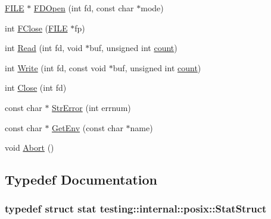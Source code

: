 \begin{DoxyCompactItemize}
\item 
\hyperlink{gmock__output__test__golden_8txt_ab12dc6c67167ae2f0af132bdd8c2955e}{F\+I\+LE} $\ast$ \hyperlink{namespacetesting_1_1internal_1_1posix_af7c268eba32d5a718b36b6b3801302e0}{F\+D\+Open} (int fd, const char $\ast$mode)
\item 
int \hyperlink{namespacetesting_1_1internal_1_1posix_af4beeaaa8d62916d5e3b644a1ddfbd6b}{F\+Close} (\hyperlink{gmock__output__test__golden_8txt_ab12dc6c67167ae2f0af132bdd8c2955e}{F\+I\+LE} $\ast$fp)
\item 
int \hyperlink{namespacetesting_1_1internal_1_1posix_a3c6ab13e581a56f1b02f3eb7536c97fd}{Read} (int fd, void $\ast$buf, unsigned int \hyperlink{gmock__stress__test_8cc_afd9db40e3361ae09188795e8cbe19752}{count})
\item 
int \hyperlink{namespacetesting_1_1internal_1_1posix_af4acf9f78d55f815a18b43786511abef}{Write} (int fd, const void $\ast$buf, unsigned int \hyperlink{gmock__stress__test_8cc_afd9db40e3361ae09188795e8cbe19752}{count})
\item 
int \hyperlink{namespacetesting_1_1internal_1_1posix_a15e5b8f2a535ef1b2529b85b861e4846}{Close} (int fd)
\item 
const char $\ast$ \hyperlink{namespacetesting_1_1internal_1_1posix_a4b77b14af6f4d18f83d303b98e9349c4}{Str\+Error} (int errnum)
\item 
const char $\ast$ \hyperlink{namespacetesting_1_1internal_1_1posix_a1d5e3da5a27eed25986859fa83cafe95}{Get\+Env} (const char $\ast$name)
\item 
void \hyperlink{namespacetesting_1_1internal_1_1posix_a69b8278c59359dd6a6f941b4643db9fb}{Abort} ()
\end{DoxyCompactItemize}


\subsection{Typedef Documentation}
\subsubsection[{\texorpdfstring{Stat\+Struct}{StatStruct}}]{\setlength{\rightskip}{0pt plus 5cm}typedef struct stat {\bf testing\+::internal\+::posix\+::\+Stat\+Struct}}\hypertarget{namespacetesting_1_1internal_1_1posix_a8eb9f08d3af29941c2d2a964cfff3ecb}{}\label{namespacetesting_1_1internal_1_1posix_a8eb9f08d3af29941c2d2a964cfff3ecb}


